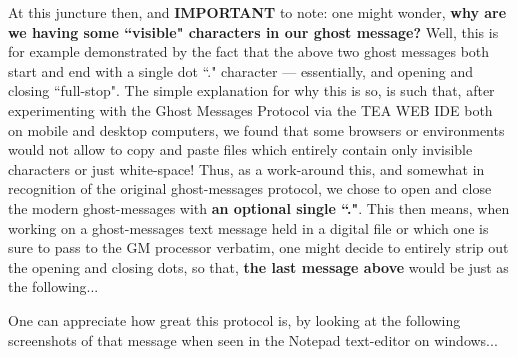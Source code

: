 \documentclass[a4paper, 18pt]{book} %
\begin{document}
{{{At this juncture then, and \textbf{IMPORTANT} to note: one might wonder, \textbf{why are we having some ``visible" characters in our ghost message?} Well, this is for example demonstrated by the fact that the above two ghost messages both start and end with a single dot ``." character --- essentially, and opening and closing ``full-stop". The simple explanation for why this is so, is such that, after experimenting with the Ghost Messages Protocol via the TEA WEB IDE both on mobile and desktop computers, we found that some browsers or environments would not allow to copy and paste files which entirely contain only invisible characters or just white-space! Thus, as a work-around this, and somewhat in recognition of the original ghost-messages protocol, we chose to open and close the modern ghost-messages with \textbf{an optional single ``."}. This then means, when working on a ghost-messages text message held in a digital file or which one is sure to pass to the GM processor verbatim, one might decide to entirely strip out the opening and closing dots, so that, \textbf{the last message above} would be just as the following...

\vspace{2em}
     \begin{tcbverbatim}[title=Sample pure GHOST-MESSAGE from GM v1.1 --- for ``Hello? 10.1 World!"]
                                                              
     
            
            
               
                                       
                           
                             
                            
                                      
                             
                           
                                                                             
               
                  
            
    
                                               

  \end{tcbverbatim}

\vspace{1em}


One can appreciate how great this protocol is, by looking at the following screenshots of that message when seen in the Notepad text-editor on windows...



}}}
\end{document}
